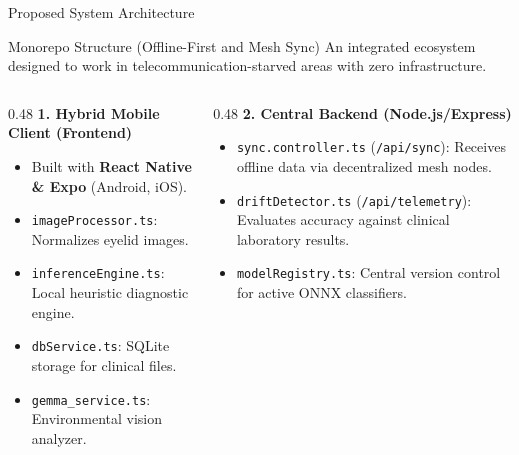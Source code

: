 \documentclass[aspectratio=169]{beamer}
\begin{document}
\begin{frame}{Proposed System Architecture}
    \begin{block}{Monorepo Structure (Offline-First and Mesh Sync)}
        An integrated ecosystem designed to work in telecommunication-starved areas with zero infrastructure.
    \end{block}
    \begin{columns}[T]
        \begin{column}{0.48\textwidth}
            \textbf{1. Hybrid Mobile Client (Frontend)}
            \begin{itemize}
                \item Built with \textbf{React Native \& Expo} (Android, iOS).
                \item \texttt{imageProcessor.ts}: Normalizes eyelid images.
                \item \texttt{inferenceEngine.ts}: Local heuristic diagnostic engine.
                \item \texttt{dbService.ts}: SQLite storage for clinical files.
                \item \texttt{gemma\_service.ts}: Environmental vision analyzer.
            \end{itemize}
        \end{column}
        \begin{column}{0.48\textwidth}
            \textbf{2. Central Backend (Node.js/Express)}
            \begin{itemize}
                \item \texttt{sync.controller.ts} (\texttt{/api/sync}): Receives offline data via decentralized mesh nodes.
                \item \texttt{driftDetector.ts} (\texttt{/api/telemetry}): Evaluates accuracy against clinical laboratory results.
                \item \texttt{modelRegistry.ts}: Central version control for active ONNX classifiers.
            \end{itemize}
        \end{column}
    \end{columns}
\end{frame}
\end{document}
